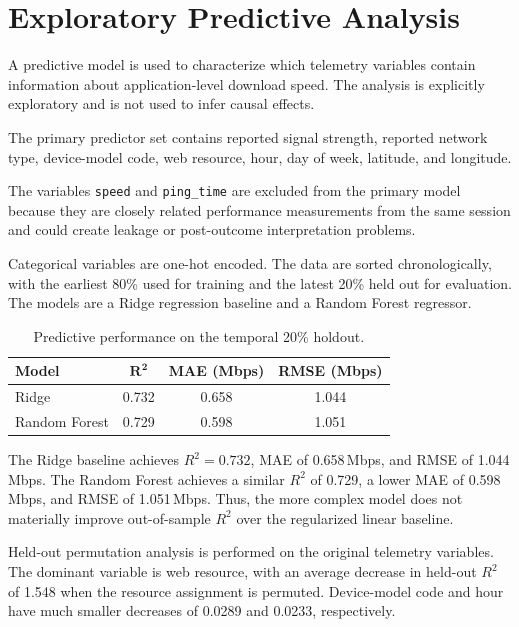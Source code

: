 \documentclass[conference]{IEEEtran}
\begin{document}
\section{Exploratory Predictive Analysis}

A predictive model is used to characterize which telemetry variables contain information about application-level download speed. The analysis is explicitly exploratory and is not used to infer causal effects.

The primary predictor set contains reported signal strength, reported network type, device-model code, web resource, hour, day of week, latitude, and longitude.

The variables \texttt{speed} and \texttt{ping\_time} are excluded from the primary model because they are closely related performance measurements from the same session and could create leakage or post-outcome interpretation problems.

Categorical variables are one-hot encoded. The data are sorted chronologically, with the earliest 80\% used for training and the latest 20\% held out for evaluation. The models are a Ridge regression baseline and a Random Forest regressor.

\begin{table}[t]
\caption{Predictive performance on the temporal 20\% holdout.}
\label{tab:ml}
\centering
\small
\begin{tabular}{lccc}
\toprule
\textbf{Model} & $\boldsymbol{R^2}$ & \textbf{MAE (Mbps)} & \textbf{RMSE (Mbps)}\\
\midrule
Ridge & 0.732 & 0.658 & 1.044\\
Random Forest & 0.729 & 0.598 & 1.051\\
\bottomrule
\end{tabular}
\end{table}

The Ridge baseline achieves $R^2=0.732$, MAE of 0.658\,Mbps, and RMSE of 1.044\,Mbps. The Random Forest achieves a similar $R^2$ of 0.729, a lower MAE of 0.598\,Mbps, and RMSE of 1.051\,Mbps. Thus, the more complex model does not materially improve out-of-sample $R^2$ over the regularized linear baseline.

Held-out permutation analysis is performed on the original telemetry variables. The dominant variable is web resource, with an average decrease in held-out $R^2$ of 1.548 when the resource assignment is permuted. Device-model code and hour have much smaller decreases of 0.0289 and 0.0233, respectively.
\end{document}
